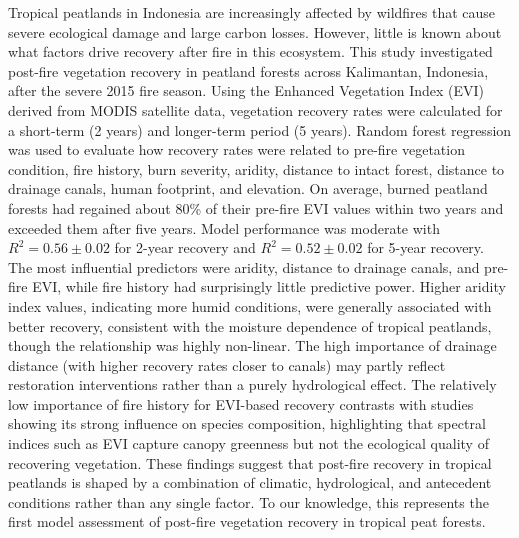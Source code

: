 \documentclass[
  fontsize=12pt,
  paper=a4,
  parskip=half,
  headings=big,
  DIV=12
]{scrreprt}
\begin{document}
Tropical peatlands in Indonesia are increasingly affected by wildfires that cause severe ecological damage and large carbon losses. However, little is known about what factors drive recovery after fire in this ecosystem. This study investigated post-fire vegetation recovery in peatland forests across Kalimantan, Indonesia, after the severe 2015 fire season. Using the Enhanced Vegetation Index (EVI) derived from MODIS satellite data, vegetation recovery rates were calculated for a short-term (2 years) and longer-term period (5 years). Random forest regression was used to evaluate how recovery rates were related to pre-fire vegetation condition, fire history, burn severity, aridity, distance to intact forest, distance to drainage canals, human footprint, and elevation. On average, burned peatland forests had regained about 80\% of their pre-fire EVI values within two years and exceeded them after five years. Model performance was moderate with $R^2 = 0.56 \pm 0.02$ for 2-year recovery and $R^2 = 0.52 \pm 0.02$ for 5-year recovery. The most influential predictors were aridity, distance to drainage canals, and pre-fire EVI, while fire history had surprisingly little predictive power. Higher aridity index values, indicating more humid conditions, were generally associated with better recovery, consistent with the moisture dependence of tropical peatlands, though the relationship was highly non-linear. The high importance of drainage distance (with higher recovery rates closer to canals) may partly reflect restoration interventions rather than a purely hydrological effect. The relatively low importance of fire history for EVI-based recovery contrasts with studies showing its strong influence on species composition, highlighting that spectral indices such as EVI capture canopy greenness but not the ecological quality of recovering vegetation. These findings suggest that post-fire recovery in tropical peatlands is shaped by a combination of climatic, hydrological, and antecedent conditions rather than any single factor. To our knowledge, this represents the first model assessment of post-fire vegetation recovery in tropical peat forests.

\tableofcontents

\renewcommand{\nomname}{List of abbreviations}
\printnomenclature
\end{document}
